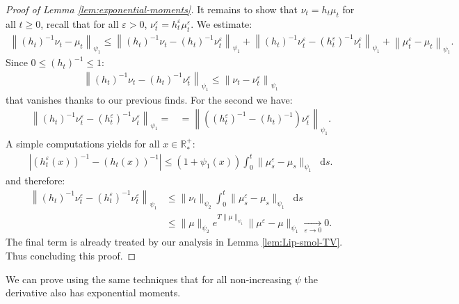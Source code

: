 \documentclass[11pt,a4paper]{article}
\newcommand{\RRP}{\mathbb{R}^+_*}
\newcommand{\dd}{\mathop{}\!\mathrm{d}}
\begin{document}
\begin{proof}[Proof of Lemma \ref{lem:exponential-moments}]
    It remains to show that $\nu_t = h_t\mu_t$ for all $t \geq 0$, recall that for all $\varepsilon > 0$, $\nu^\varepsilon_t = h^\varepsilon_t\mu^\varepsilon_t$. We estimate:
    \begin{align*}
        \left\| (h_t)^{-1}\nu_t - \mu_t \right\|_{\psi_1} \leq \left\|(h_t)^{-1}\nu_t - (h_t)^{-1}\nu^\varepsilon_t\right\|_{\psi_1}  + \left\|(h_t)^{-1}\nu^\varepsilon_t - (h^\varepsilon_t)^{-1}\nu^\varepsilon_t\right\|_{\psi_1} + \left\|\mu^\varepsilon_t - \mu_t\right\|_{\psi_1}.
    \end{align*}
    Since $0 \leq (h_t)^{-1} \leq 1$:
    \begin{align*}
        \left\|(h_t)^{-1}\nu_t - (h_t)^{-1}\nu^\varepsilon_t\right\|_{\psi_1} \leq \left\|\nu_t - \nu^\varepsilon_t\right\|_{\psi_1} 
    \end{align*}
    that vanishes thanks to our previous finds. For the second we have:
    \begin{align*}
        \left\|(h_t)^{-1}\nu^\varepsilon_t - (h^\varepsilon_t)^{-1}\nu^\varepsilon_t\right\|_{\psi_1} =
        &= \left\|((h^\varepsilon_t)^{-1} - (h_t)^{-1})\nu^\varepsilon_t\right\|_{\psi_1}.
    \end{align*}
    A simple computations yields for all $x \in \RRP$:
    \begin{align*}
        \left|\left( h^\varepsilon_t(x)\right)^{-1} - \left(h_t(x)\right)^{-1} \right| \leq (1 + \psi_1(x))\int_0^t \| \mu^\varepsilon_s - \mu_s \|_{\psi_1} \dd s .
    \end{align*}
    and therefore:
    \begin{align*}
        \left\|(h_t)^{-1}\nu^\varepsilon_t - (h^\varepsilon_t)^{-1}\nu^\varepsilon_t\right\|_{\psi_1} &\leq \|\nu_t\|_{\psi_2} \int_0^t \| \mu^\varepsilon_s - \mu_s \|_{\psi_1} \dd s \\
        &\leq  \|\mu\|_{\psi_2} e^{T\|\mu\|_{\psi_1}} \| \mu^\varepsilon - \mu \|_{\psi_1} \xrightarrow[\varepsilon \to 0]{} 0.
    \end{align*}
    The final term is already treated by our analysis in Lemma \ref{lem:Lip-smol-TV}. Thus concluding this proof.
\end{proof}
We can prove using the same techniques that for all non-increasing $\psi$ the derivative also has exponential moments.
\end{document}
